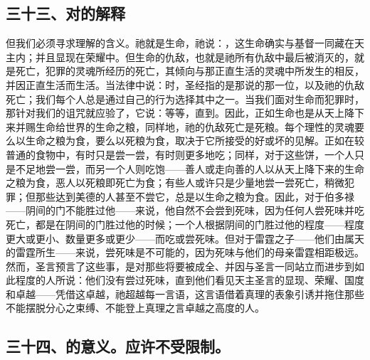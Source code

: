 
\subsection{三十三、对的解释}

但我们必须寻求理解的含义。祂就是生命，祂说：，这生命确实与基督一同藏在天主内；并且显现在荣耀中。但生命的仇敌，也就是祂所有仇敌中最后被消灭的，就是死亡，犯罪的灵魂所经历的死亡，其倾向与那正直生活的灵魂中所发生的相反，并因正直生活而生活。当法律中说：时，圣经指的是那说的那一位，以及祂的仇敌死亡；我们每个人总是通过自己的行为选择其中之一。当我们面对生命而犯罪时，那针对我们的诅咒就应验了，它说：等等，直到。因此，正如生命也是从天上降下来并赐生命给世界的生命之粮，同样地，祂的仇敌死亡是死粮。每个理性的灵魂要么以生命之粮为食，要么以死粮为食，取决于它所接受的好或坏的见解。正如在较普通的食物中，有时只是尝一尝，有时则更多地吃；同样，对于这些饼，一个人只是不足地尝一尝，而另一个人则吃饱——善人或走向善的人以从天上降下来的生命之粮为食，恶人以死粮即死亡为食；有些人或许只是少量地尝一尝死亡，稍微犯罪；但那些达到美德的人甚至不尝它，总是以生命之粮为食。因此，对于伯多禄——阴间的门不能胜过他——来说，他自然不会尝到死味，因为任何人尝死味并吃死亡，都是在阴间的门胜过他的时候；一个人根据阴间的门胜过他的程度——程度更大或更小、数量更多或更少——而吃或尝死味。但对于雷霆之子——他们由属天的雷霆所生——来说，尝死味是不可能的，因为死味与他们的母亲雷霆相距极远。然而，圣言预言了这些事，是对那些将要被成全、并因与圣言一同站立而进步到如此程度的人所说：他们没有尝过死味，直到他们看见天主圣言的显现、荣耀、国度和卓越——凭借这卓越，祂超越每一言语，这言语借着真理的表象引诱并拖住那些不能摆脱分心之束缚、不能登上真理之言卓越之高度的人。\par


\subsection{三十四、的意义。应许不受限制。}

